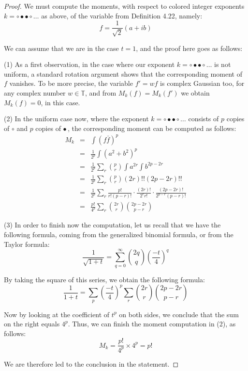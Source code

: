 \documentclass[12pt]{amsbook}
\begin{document}
\begin{proof}
We must compute the moments, with respect to colored integer exponents $k=\circ\bullet\bullet\circ\ldots$ as above, of the variable from Definition 4.22, namely:
$$f=\frac{1}{\sqrt{2}}(a+ib)$$

We can assume that we are in the case $t=1$, and the proof here goes as follows:

\medskip

(1) As a first observation, in the case where our exponent $k=\circ\bullet\bullet\circ\ldots$ is not uniform, a standard rotation argument shows that the corresponding moment of $f$ vanishes. To be more precise, the variable $f'=wf$ is complex Gaussian too, for any complex number $w\in\mathbb T$, and from $M_k(f)=M_k(f')$ we obtain $M_k(f)=0$, in this case.

\medskip

(2) In the uniform case now, where the exponent $k=\circ\bullet\bullet\circ\ldots$ consists of $p$ copies of $\circ$ and $p$ copies of $\bullet$\,, the corresponding moment can be computed as follows:
\begin{eqnarray*}
M_k
&=&\int(f\bar{f})^p\\
&=&\frac{1}{2^p}\int(a^2+b^2)^p\\
&=&\frac{1}{2^p}\sum_r\binom{p}{r}\int a^{2r}\int b^{2p-2r}\\
&=&\frac{1}{2^p}\sum_r\binom{p}{r}(2r)!!(2p-2r)!!\\
&=&\frac{1}{2^p}\sum_r\frac{p!}{r!(p-r)!}\cdot\frac{(2r)!}{2^rr!}\cdot\frac{(2p-2r)!}{2^{p-r}(p-r)!}\\
&=&\frac{p!}{4^p}\sum_r\binom{2r}{r}\binom{2p-2r}{p-r}
\end{eqnarray*}

(3) In order to finish now the computation, let us recall that we have the following formula, coming from the generalized binomial formula, or from the Taylor formula:
$$\frac{1}{\sqrt{1+t}}=\sum_{q=0}^\infty\binom{2q}{q}\left(\frac{-t}{4}\right)^q$$

By taking the square of this series, we obtain the following formula:
$$\frac{1}{1+t}
=\sum_p\left(\frac{-t}{4}\right)^p\sum_r\binom{2r}{r}\binom{2p-2r}{p-r}$$

Now by looking at the coefficient of $t^p$ on both sides, we conclude that the sum on the right equals $4^p$. Thus, we can finish the moment computation in (2), as follows:
$$M_k=\frac{p!}{4^p}\times 4^p=p!$$

We are therefore led to the conclusion in the statement.
\end{proof}
\end{document}
